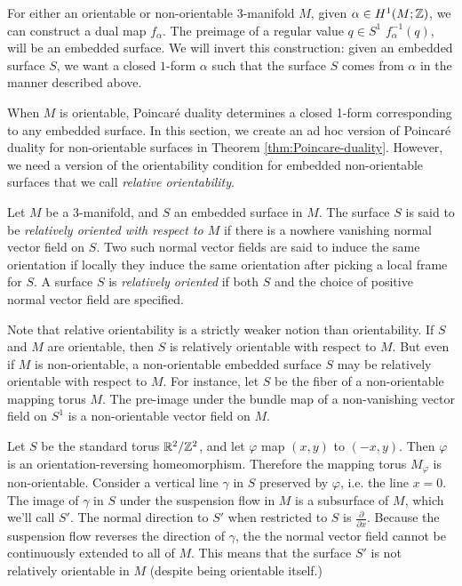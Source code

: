 For either an orientable or non-orientable 3-manifold $M$, given $\alpha\in H^1(M; \mathbb{Z})$, we can construct a dual map $f_\alpha$.  The preimage of a regular value $q\in S^1$ $f_{\alpha}^{-1}(q)$, will be an embedded surface. %
We will invert this construction: given an embedded surface $S$, we want a
closed $1$-form $\alpha$ such that the surface $S$ comes from $\alpha$ in the manner described
above.

When $M$ is orientable, Poincar\'e duality determines a closed 1-form corresponding to any embedded surface.  In this section, we create an ad hoc version of Poincar\'e duality for non-orientable surfaces in Theorem \ref{thm:Poincare-duality}.
However, we need a version of the orientability condition for embedded non-orientable surfaces that we call \emph{relative orientability}.

  Let $M$ be a $3$-manifold, and $S$ an embedded surface in $M$. The surface $S$ is said to be {\it relatively
  oriented with respect to $M$} if there is a nowhere vanishing normal vector field on $S$. Two
  such normal vector fields are said to induce the same orientation if locally they induce the
  same orientation after picking a local frame for $S$. A surface $S$ is \emph{relatively oriented}
  if both $S$ and the choice of positive normal vector field are specified.

Note that relative orientability is a strictly weaker notion than orientability. If $S$ and $M$ are
orientable, then $S$ is relatively orientable with respect to $M$. But even if $M$ is
non-orientable, a non-orientable embedded surface $S$ may be relatively orientable with respect to $M$. For instance, let $S$ be
the fiber of a non-orientable mapping torus $M$.  The pre-image under the bundle map of a non-vanishing vector field on $S^1$ is a non-orientable vector field on $M$.

  Let $S$ be the standard torus $\mathbb{R}^2/\mathbb{Z}^2$, and let $\varphi$ map $(x,y)$ to $(-x, y)$. Then $\varphi$ is an
  orientation-reversing homeomorphism.  Therefore the mapping torus $M_\varphi$ is non-orientable. Consider a vertical line $\gamma$ in $S$ preserved by $\varphi$, i.e. the line
  $x = 0$. The image of $\gamma$ in $S$ under the suspension flow in $M$ is a subsurface of $M$,
  which we'll call $S'$. The normal direction to $S'$ when restricted to $S$ is $\frac{\partial}{\partial x}$. Because the suspension flow reverses the direction of $\gamma$, the
  the normal vector field cannot be continuously extended to all of $M$.
  This means that the surface $S'$ is not relatively orientable in $M$ (despite being orientable itself.)


